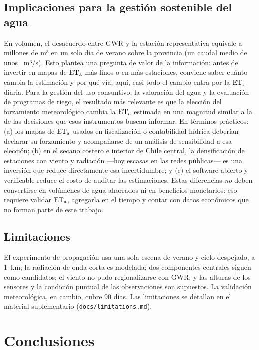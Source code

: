 \subsection{Implicaciones para la gestión sostenible del agua}

En volumen, el desacuerdo entre GWR y la estación representativa equivale a
\VolDiffAbsCThreeGWR{} millones de m³ en un solo día de verano sobre la provincia
(un caudal medio de unos \VolDiffFlowCThreeGWR~m³/s). Esto plantea una pregunta de
valor de la información: antes de invertir en mapas de $\mathrm{ET_a}$ más finos o en más
estaciones, conviene saber cuánto cambia la estimación y por qué vía; aquí,
casi todo el cambio entra por la $\mathrm{ET_r}$ diaria. Para la gestión del uso consuntivo, la valoración del agua y la evaluación
de programas de riego, el resultado más relevante es que la elección del
forzamiento meteorológico cambia la $\mathrm{ET_a}$ estimada en una magnitud similar
a la de las decisiones que esos instrumentos buscan informar. En términos
prácticos: (a) los mapas de $\mathrm{ET_a}$ usados en fiscalización o contabilidad
hídrica deberían declarar su forzamiento y acompañarse de un análisis de
sensibilidad a esa elección; (b) en el secano costero e interior de Chile
central, la densificación de estaciones con viento y radiación ---hoy
escasas en las redes públicas--- es una inversión que reduce directamente
esa incertidumbre; y (c) el software abierto y verificable reduce el costo
de auditar las estimaciones. Estas diferencias \emph{no} deben convertirse en
volúmenes de agua ahorrados ni en beneficios monetarios: eso requiere
validar $\mathrm{ET_a}$, agregarla en el tiempo y contar con datos económicos que no
forman parte de este trabajo.

\subsection{Limitaciones}

El experimento de propagación usa una sola escena de verano y cielo
despejado, a 1~km; la radiación de onda corta es modelada; dos componentes
centrales siguen como candidatos; el viento no pudo regionalizarse con GWR;
y las alturas de los sensores y la condición puntual de las observaciones
son supuestos. La validación meteorológica, en cambio, cubre 90 días. Las
limitaciones se detallan en el material suplementario
(\texttt{docs/limitations.md}).

\section{Conclusiones}\label{sec:conclusions}

